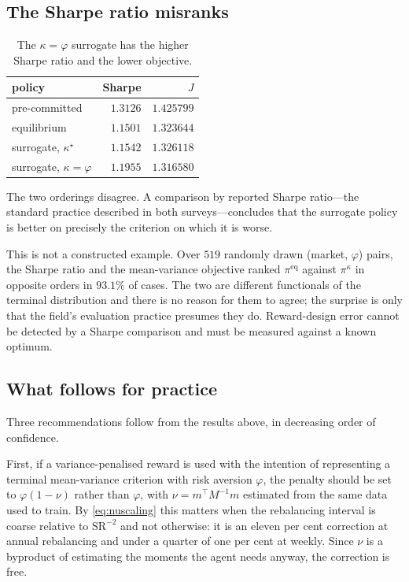 \documentclass[11pt,a4paper]{article}
\theoremstyle{plain}
\theoremstyle{definition}
\theoremstyle{remark}
\newcommand{\pieq}{\pi^{\mathrm{eq}}}
\newcommand{\pir}{\pi^{\kappa}}
\begin{document}
\subsection{The Sharpe ratio misranks}

\begin{table}[h]\centering\small
\begin{tabular}{lrr}
\toprule
policy & Sharpe & $J$\\
\midrule
pre-committed & $1.3126$ & $1.425799$\\
equilibrium & $1.1501$ & $1.323644$\\
surrogate, $\kappa^{\star}$ & $1.1542$ & $1.326118$\\
surrogate, $\kappa=\varphi$ & $\mathbf{1.1955}$ & $\mathbf{1.316580}$\\
\bottomrule
\end{tabular}
\caption{The $\kappa=\varphi$ surrogate has the higher Sharpe ratio and the lower
objective.}
\label{tab:sharpe}
\end{table}

The two orderings disagree. A comparison by reported Sharpe ratio---the standard
practice described in both surveys---concludes that the surrogate policy is
better on precisely the criterion on which it is worse.

This is not a constructed example. Over $519$ randomly drawn (market, $\varphi$)
pairs, the Sharpe ratio and the mean-variance objective ranked $\pieq$ against
$\pir$ in opposite orders in $93.1\%$ of cases. The two are different functionals
of the terminal distribution and there is no reason for them to agree; the
surprise is only that the field's evaluation practice presumes they do.
Reward-design error cannot be detected by a Sharpe comparison and must be
measured against a known optimum.

\subsection{What follows for practice}

Three recommendations follow from the results above, in decreasing order of
confidence.

First, if a variance-penalised reward is used with the intention of representing
a terminal mean-variance criterion with risk aversion $\varphi$, the penalty
should be set to $\varphi(1-\nu)$ rather than $\varphi$, with
$\nu=m^{\top}M^{-1}m$ estimated from the same data used to train. By
\eqref{eq:nuscaling} this matters when the rebalancing interval is coarse
relative to $\mathrm{SR}^{-2}$ and not otherwise: it is an eleven per cent
correction at annual rebalancing and under a quarter of one per cent at weekly.
Since $\nu$ is a byproduct of estimating the moments the agent needs anyway, the
correction is free.
\end{document}
